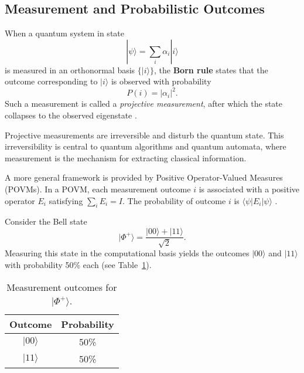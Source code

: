 
\subsection{Measurement and Probabilistic Outcomes}
\label{subsec:measurement}
\begin{definition}
    When a quantum system in state
    \[
    |\psi\rangle = \sum_i \alpha_i |i\rangle
    \]
    is measured in an orthonormal basis \(\{|i\rangle\}\), the \textbf{Born rule} states that the outcome corresponding to \(|i\rangle\) is observed with probability
    \[
    P(i) = |\alpha_i|^2.
    \]
    Such a measurement is called a \emph{projective measurement}, after which the state collapses to the observed eigenstate \cite{nielsen2010quantum}.
\end{definition}

\begin{remark}
Projective measurements are irreversible and disturb the quantum state. This irreversibility is central to quantum algorithms and quantum automata, where measurement is the mechanism for extracting classical information.
\end{remark}

\begin{definition}
    A more general framework is provided by Positive Operator-Valued Measures (POVMs). In a POVM, each measurement outcome \(i\) is associated with a positive operator \(E_i\) satisfying \(\sum_i E_i = I\). The probability of outcome \(i\) is \(\langle \psi | E_i | \psi \rangle\) \cite{nielsen2010quantum}.
\end{definition}

\begin{example}
Consider the Bell state
\[
|\Phi^+\rangle = \frac{|00\rangle + |11\rangle}{\sqrt{2}}.
\]
Measuring this state in the computational basis yields the outcomes \(|00\rangle\) and \(|11\rangle\) with probability 50\% each (see Table~\ref{tab:bell_measurement}).
\end{example}

\begin{table}[h]
\centering
\caption{Measurement outcomes for \(|\Phi^+\rangle\).}
\label{tab:bell_measurement}
\begin{tabular}{|c|c|}
\hline
\textbf{Outcome} & \textbf{Probability} \\ \hline
\( |00\rangle \) & 50\% \\ \hline
\( |11\rangle \) & 50\% \\ \hline
\end{tabular}
\end{table}


